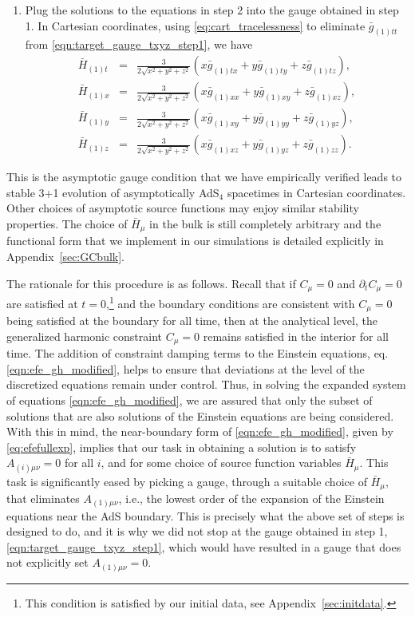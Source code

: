 \documentclass[a4paper,11pt]{article}
\numberwithin{equation}{section}
\begin{document}
\begin{enumerate}
\item Plug the solutions to the equations in step 2 into the gauge obtained in step 1.
In Cartesian coordinates, using \eqref{eq:cart_tracelessness} to eliminate $\bar{g}_{(1)tt}$ from \eqref{eqn:target_gauge_txyz_step1}, we have
\begin{eqnarray}\label{eqn:target_gauge_txyz}
\bar{H}_{(1)t}&=&\frac{3}{2\sqrt{x^2+y^2+z^2}}(x \bar{g}_{(1)tx}+y\bar{g}_{(1)ty}+z\bar{g}_{(1)tz}),\nonumber\\
\bar{H}_{(1)x}&=&\frac{3}{2\sqrt{x^2+y^2+z^2}}(x \bar{g}_{(1)xx}+y\bar{g}_{(1)xy}+z\bar{g}_{(1)xz}), \nonumber \\
\bar{H}_{(1)y}&=&\frac{3}{2\sqrt{x^2+y^2+z^2}}(x \bar{g}_{(1)xy}+y\bar{g}_{(1)yy}+z\bar{g}_{(1)yz}), \nonumber \\
\bar{H}_{(1)z}&=&\frac{3}{2\sqrt{x^2+y^2+z^2}}(x \bar{g}_{(1)xz}+y\bar{g}_{(1)yz}+z\bar{g}_{(1)zz}).
\end{eqnarray}
\end{enumerate}
This is the asymptotic gauge condition that we have empirically verified leads to stable 3+1 evolution of asymptotically AdS$_4$ spacetimes in Cartesian coordinates.
Other choices of asymptotic source functions may enjoy similar stability properties.
The choice of $\bar{H}_\mu$ in the bulk is still completely arbitrary and the functional form that we implement in our simulations is detailed explicitly in Appendix~\ref{sec:GCbulk}.

The rationale for this procedure is as follows.
Recall that if $C_\mu=0$ and $\partial_t C_\mu=0$ are satisfied at $t=0$,\footnote{This condition is satisfied by our initial data, see Appendix~\ref{sec:initdata}.} and the boundary conditions are consistent with $C_\mu=0$ being satisfied at the boundary for all time, then at the analytical level, the generalized harmonic constraint $C_\mu=0$ remains satisfied in the interior for all time. 
The addition of constraint damping terms to the Einstein equations, eq. \eqref{eqn:efe_gh_modified}, helps to ensure that deviations at the level of the discretized equations remain under control. 
Thus, in solving the expanded system of equations \eqref{eqn:efe_gh_modified}, we are assured that only the subset of solutions that are also solutions of the Einstein equations are being considered.
With this in mind, the near-boundary form of \eqref{eqn:efe_gh_modified}, given by \eqref{eq:efefullexp}, implies that our task in obtaining a solution is to satisfy $A_{(i)\mu\nu}=0$ for all $i$, and for some choice of source function variables $\bar{H}_\mu$. 
This task is significantly eased by picking a gauge, through a suitable choice of $\bar{H}_\mu$, that eliminates $A_{(1)\mu\nu}$, i.e., the lowest order of the expansion of the Einstein equations near the AdS boundary.
This is precisely what the above set of steps is designed to do, and it is why we did not stop at the gauge obtained in step 1, \eqref{eqn:target_gauge_txyz_step1}, which would have resulted in a gauge that does not explicitly set $A_{(1)\mu\nu}=0$. 
\end{document}
